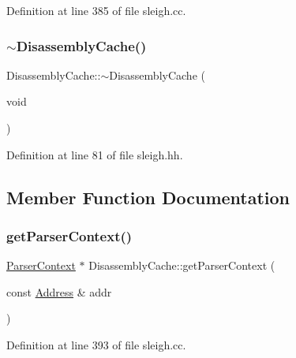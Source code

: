 Definition at line 385 of file sleigh.\+cc.

\mbox{\label{class_disassembly_cache_a78395c2e69a662650170fdfc8b23af74}} 
\subsubsection{\texorpdfstring{$\sim$DisassemblyCache()}{~DisassemblyCache()}}
{\footnotesize\ttfamily Disassembly\+Cache\+::$\sim$\+Disassembly\+Cache (\begin{DoxyParamCaption}\item[{void}]{ }\end{DoxyParamCaption})\hspace{0.3cm}{\ttfamily [inline]}}



Definition at line 81 of file sleigh.\+hh.



\subsection{Member Function Documentation}
\mbox{\label{class_disassembly_cache_afab4ffc5dc52eb4cc6da82e13a1d5107}} 
\subsubsection{\texorpdfstring{getParserContext()}{getParserContext()}}
{\footnotesize\ttfamily \mbox{\hyperlink{class_parser_context}{Parser\+Context}} $\ast$ Disassembly\+Cache\+::get\+Parser\+Context (\begin{DoxyParamCaption}\item[{const \mbox{\hyperlink{class_address}{Address}} \&}]{addr }\end{DoxyParamCaption})}



Definition at line 393 of file sleigh.\+cc.

